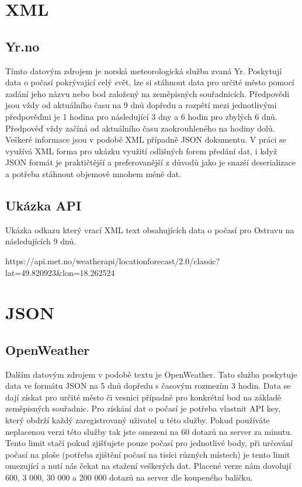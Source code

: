 \documentclass[czech,bachelor,dept460,male,csharp,cpdeclaration]{diploma}
\begin{document}
	\section{XML}
	\subsection{Yr.no}
	
	Tímto datovým zdrojem je norská meteorologická služba zvaná Yr. Poskytují data o počasí pokrývající celý svět, lze si stáhnout data pro určité město pomocí zadání jeho názvu nebo bod založený na zeměpisných souřadnicích. Předpovědi jsou vždy od aktuálního času na 9 dnů dopředu a rozpětí mezi jednotlivými předpověďmi je 1 hodina pro následující 3 dny a 6 hodin pro zbylých 6 dnů. Předpověď vždy začíná od aktuálního času zaokrouhleného na hodiny dolů. Veškeré informace jsou v podobě XML případně JSON dokumentu. V práci se využívá XML forma pro ukázku využití odlišných forem předání dat, i když JSON formát je praktičtější a preferovanější z důvodů jako je snazší deserializace a potřeba stáhnout objemově mnohem méně dat.
	
	\subsection{Ukázka API}
	
	Ukázka odkazu který vrací XML text obsahujících data o počasí pro Ostravu na následujících 9 dnů.
	
	https://api.met.no/weatherapi/locationforecast/2.0/classic?lat=49.820923\&lon=18.262524
	
	\section{JSON}
	\subsection{OpenWeather}
	
	Dalším datovým zdrojem v podobě textu je OpenWeather. Tato služba poskytuje data ve formátu JSON na 5 dnů dopředu s časovým rozmezím 3 hodin. Data se dají získat pro určité město či vesnici případně pro konkrétní bod na základě zeměpisných souřadnic. Pro získání dat o počasí je potřeba vlastnit API key, který obdrží každý zaregistrovaný uživatel u této služby. Pokud používáte neplacenou verzi této služby tak jste omezeni na 60 dotazů na server za minutu. Tento limit stačí pokud zjišťujete pouze počasí pro jednotlivé body, při určování počasí na ploše (potřeba zjištění počasí na tisíci různých místech) je tento limit omezující a nutí nás čekat na stažení veškerých dat. Placené verze nám dovolují 600, 3 000, 30 000 a 200 000 dotazů na server dle koupeného balíčku.
	
\end{document}
